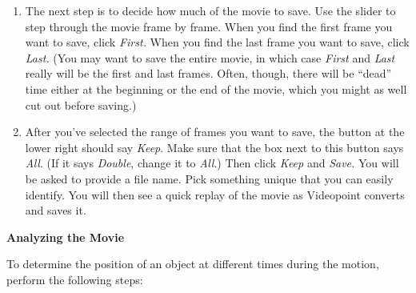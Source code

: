 \begin{enumerate}
\item The next step is to decide how much of the movie to save.
Use the slider to step through the movie frame by frame.  When you
find the first frame you want to save, click \textit{First.}  When you find
the last frame you want to save, click \textit{Last.}  
(You may want to save the 
entire movie, in which case \textit{First} and \textit{Last} really will be the
first and last frames.  Often, though, there will be ``dead'' time
either at the beginning or the end of the movie, which you might
as well cut out before saving.)

\item After you've selected the range of frames you want to save, the button
at the lower right should say \textit{Keep}.  Make sure that the 
box next to this button says \textit{All}.  (If it says \textit{Double},
change it to \textit{All}.)
Then click \textit{Keep}
and \textit{Save.} You will be asked to provide a file name. Pick something unique that you can easily identify. You will then see a quick replay of the movie as Videopoint
converts and saves it.


\end{enumerate}
\textbf{Analyzing the Movie} 

To determine the position of an object at different times during the
motion, perform the following steps:

